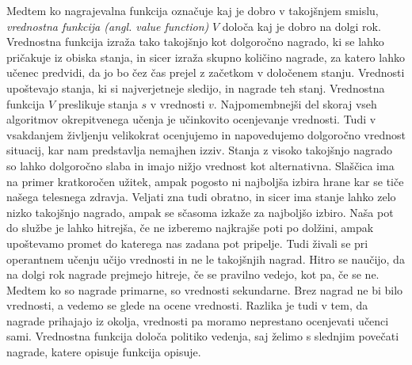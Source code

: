 \documentclass[a4paper, oneside, 12pt]{report}
\begin{document}
Medtem ko nagrajevalna funkcija označuje kaj je dobro v takojšnjem smislu, {\em vrednostna funkcija (angl. value function)} $V$ določa kaj je dobro na dolgi rok. Vrednostna funkcija izraža tako takojšnjo kot dolgoročno nagrado, ki se lahko pričakuje iz obiska stanja, in sicer izraža skupno količino nagrade, za katero lahko učenec predvidi, da jo bo čez čas prejel z začetkom v določenem stanju. Vrednosti upoštevajo stanja, ki si najverjetneje sledijo, in nagrade teh stanj. Vrednostna funkcija $V$ preslikuje stanja $s$ v vrednosti $v$. Najpomembnejši del skoraj vseh algoritmov okrepitvenega učenja je učinkovito ocenjevanje vrednosti. Tudi v vsakdanjem življenju velikokrat ocenjujemo in napovedujemo dolgoročno vrednost situacij, kar nam predstavlja nemajhen izziv. Stanja z visoko takojšnjo nagrado so lahko dolgoročno slaba in imajo nižjo vrednost kot alternativna. Slaščica ima na primer kratkoročen užitek, ampak pogosto ni najboljša izbira hrane kar se tiče našega telesnega zdravja. Veljati zna tudi obratno, in sicer ima stanje lahko zelo nizko takojšnjo nagrado, ampak se sčasoma izkaže za najboljšo izbiro. Naša pot do službe je lahko hitrejša, če ne izberemo najkrajše poti po dolžini, ampak upoštevamo promet do katerega nas zadana pot pripelje. Tudi živali se pri operantnem učenju učijo vrednosti in ne le takojšnjih nagrad. Hitro se naučijo, da na dolgi rok nagrade prejmejo hitreje, če se pravilno vedejo, kot pa, če se ne. Medtem ko so nagrade primarne, so vrednosti sekundarne. Brez nagrad ne bi bilo vrednosti, a vedemo se glede na ocene vrednosti. Razlika je tudi v tem, da nagrade prihajajo iz okolja, vrednosti pa moramo neprestano ocenjevati učenci sami. Vrednostna funkcija določa politiko vedenja, saj želimo s slednjim povečati nagrade, katere opisuje funkcija opisuje.
\end{document}
